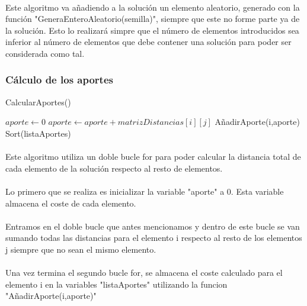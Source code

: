 \documentclass{article}
\begin{document}
	\paragraph{}Este algoritmo va añadiendo a la solución un elemento aleatorio, generado con la función "GeneraEnteroAleatorio(semilla)", siempre que este no forme parte ya de la solución. Esto lo realizará simpre que el número de elementos introducidos sea inferior al número de elementos que debe contener una solución para poder ser considerada como tal.
	
	\subsubsection{Cálculo de los aportes}
	\begin{algorithm}[H]
		\caption{CalcularAportes()}
		\begin{algorithmic}
			\STATE $aporte \leftarrow 0$
			\STATE $aporte \leftarrow aporte + matrizDistancias[i][j]$
			\ENDFOR
			\STATE AñadirAporte(i,aporte)
			\ENDFOR
			\STATE Sort(listaAportes)
			
		\end{algorithmic}
	\end{algorithm}
	
	\paragraph{}Este algoritmo utiliza un doble bucle for para poder calcular la distancia total de cada elemento de la solución respecto al resto de elementos.
	
	\paragraph{}Lo primero que se realiza es inicializar la variable "aporte" a 0. Esta variable almacena el coste de cada elemento.
	
	\paragraph{}Entramos en el doble bucle que antes mencionamos y dentro de este bucle se van sumando todas las distancias para el elemento i respecto al resto de los elementos j siempre que no sean el mismo elemento.
	
	\paragraph{}Una vez termina el segundo bucle for, se almacena el coste calculado para el elemento i en la variables "listaAportes" utilizando la funcion "AñadirAporte(i,aporte)"
	
\end{document}
